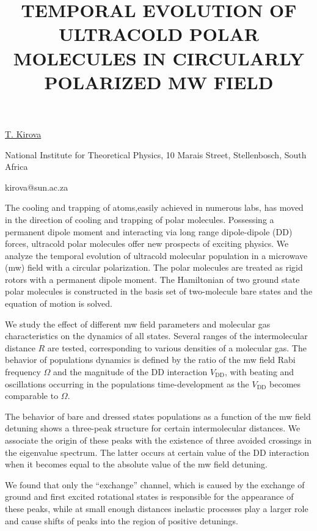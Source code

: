 \title{TEMPORAL EVOLUTION OF ULTRACOLD POLAR MOLECULES IN CIRCULARLY POLARIZED MW FIELD}

\underline{T. Kirova}

{\normalsize{\vspace{-4mm}
National Institute for Theoretical Physics, 10 Marais Street, Stellenbosch, South Africa

\email kirova@sun.ac.za}}

The cooling and trapping of atoms,easily achieved in numerous labs, has moved in the direction of cooling and trapping of polar molecules. Possessing a permanent dipole moment and interacting via long range dipole-dipole (DD) forces, ultracold polar molecules offer new prospects of exciting physics. We analyze the temporal evolution of ultracold molecular population in a microwave (mw) field with a circular polarization. The polar molecules are treated as rigid rotors with a permanent dipole moment. The Hamiltonian of two ground state polar molecules is constructed in the basis set of two-molecule bare states and the equation of motion is solved.

We study the effect of different mw field parameters and molecular gas characteristics on the dynamics of all states. Several ranges of the intermolecular distance $R$ are tested, corresponding to various densities of a molecular gas. The behavior of populations dynamics is defined by the ratio of the mw field Rabi frequency $\Omega$ and the magnitude of the DD interaction $V_{\text{DD}}$, with beating and oscillations occurring in the populations time-development as the $V_{\text{DD}}$ becomes comparable to $\Omega$.

The behavior of bare and dressed states populations as a function of the mw field detuning shows a three-peak structure for certain intermolecular distances. We associate the origin of these peaks with the existence of three avoided crossings in the eigenvalue spectrum. The latter occurs at certain value of the DD interaction when it becomes equal to the absolute value of the mw field detuning.

We found that only the ``exchange'' channel, which is caused by the exchange of ground and first excited rotational states is responsible for the appearance of these peaks, while at small enough distances inelastic processes play a larger role and cause shifts of peaks into the region of positive detunings.

\vspace{\baselineskip} 